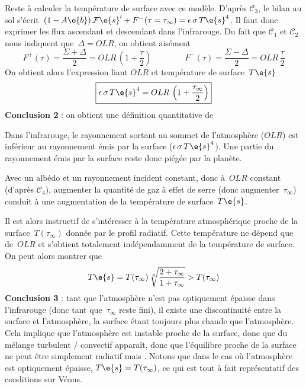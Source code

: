 \sk
Reste à calculer la température de surface avec ce modèle. D'après $\mathcal{C}_3$, le bilan
au sol s'écrit~$(1-A\e{b}) \, \mathcal{F}\e{s}' + F^-(\tau=\tau_{\infty}) = \epsilon\,\sigma\,T\e{s}^4$.
Il faut donc exprimer les flux ascendant et descendant dans l'infrarouge.
Du fait que $\mathcal{C}_1$ et $\mathcal{C}_2$ nous indiquent que~$\Delta=OLR$, on obtient aisément
\[
F^+(\tau) = \frac{\Sigma+\Delta}{2} = OLR \, (1+\frac{\tau}{2})
\qquad \qquad
F^-(\tau) = \frac{\Sigma-\Delta}{2} = OLR \, \frac{\tau}{2}
\]
\noindent On obtient alors l'expression liant $OLR$
et température de surface~$T\e{s}$
\[
\boxed{\epsilon\,\sigma\,T\e{s}^4 = OLR \, \left( 1 + \frac{\tau_{\infty}}{2} \right)}
\]
\textbf{Conclusion 2} : on obtient une définition quantitative de 
\begin{citemize}
\item Dans l'infrarouge, le rayonnement sortant au sommet de l'atmosphère ($OLR$)
est inférieur au rayonnement émis par la surface ($\epsilon\,\sigma\,T\e{s}^4$).
Une partie du rayonnement émis par la surface reste donc piégée par la planète.
\item Avec un albédo et un rayonnement incident constant, donc à~$OLR$ constant (d'après $\mathcal{C}_4$),
augmenter la quantité de gaz à effet de serre (donc augmenter~$\tau_{\infty}$)
conduit à une augmentation de la température de surface~$T\e{s}$.
\end{citemize}

\sk
Il est alors instructif de s'intéresser à la température atmosphérique 
proche de la surface~$T(\tau_\infty)$
donnée par le profil radiatif. Cette température ne dépend que de~$OLR$
et s'obtient totalement indépendamment de la température de surface.
On peut alors montrer que
\[
T\e{s} = T(\tau_\infty) \, \sqrt[4]{\frac{2+\tau_\infty}{1+\tau_\infty}} > T(\tau_\infty)
\]
\noindent \textbf{Conclusion 3} : tant que l'atmosphère n'est pas
optiquement épaisse dans l'infrarouge (donc tant que~$\tau_\infty$ reste fini),
il existe une discontinuité entre la surface et l'atmosphère, la surface
étant toujours plus chaude que l'atmosphère. Cela implique que l'atmosphère
est instable proche de la surface, donc que du mélange turbulent / convectif
apparaît, donc que l'équilibre proche de la surface ne peut être simplement
radiatif mais . Notons que dans le cas où l'atmosphère est optiquement épaisse,
$T\e{s} = T(\tau_\infty)$, ce qui est tout à fait représentatif des conditions sur Vénus.


